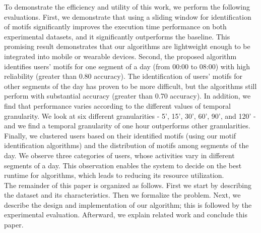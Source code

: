 \documentclass{sig-alternate}
\begin{document}
To demonstrate the efficiency and utility of this work, we perform the following evaluations. First, we demonstrate that using a sliding window for identification of motifs significantly improves the execution time performance on both experimental datasets, and it significantly outperforms the baseline. This promising result demonstrates that our algorithms are lightweight enough to be integrated into mobile or wearable devices. 
Second, the proposed algorithm identifies users' motifs for one segment of a day (from 00:00 to 08:00) with high reliability (greater than 0.80 accuracy). The identification of users' motifs for other segments of the day has proven to be more difficult, but the algorithms still perform with substantial accuracy (greater than 0.70 accuracy). In addition, we find that performance varies according to the different values of temporal granularity. We look at six different granularities - 5', 15', 30', 60', 90', and 120' - and we find a temporal granularity of one hour outperforms other granularities. Finally, we clustered users based on their identified motifs (using our motif identification algorithms) and the distribution of motifs among segments of the day. We observe three categories of users, whose activities vary in different segments of a day. This observation enables the system to decide on the best runtime for algorithms, which leads to reducing its resource utilization. \\
The remainder of this paper is organized as follows. First we start by describing the dataset and its characteristics. Then we formalize the problem. Next, we describe the design and implementation of our algorithm; this is followed by the experimental evaluation. Afterward, we explain related work and conclude this paper.
\vspace{-0.2cm} 
\end{document}
